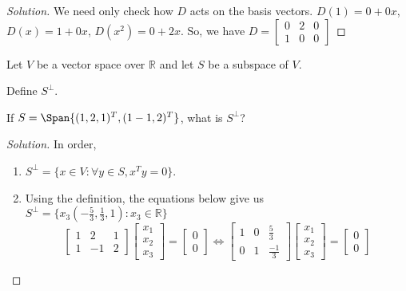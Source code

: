 \documentclass[crop=false,class=book,oneside]{standalone}
\begin{document}
\begin{proof}[Solution]
We need only check how $D$ acts on the basis vectors. $D(1) = 0+0x$, $D(x) = 1+0x$, $D(x^2) = 0+2x$. So, we have $D = \begin{bmatrix} 0 & 2 & 0 \\ 1 & 0 & 0 \end{bmatrix}$
\end{proof}
\begin{problem}
Let $V$ be a vector space over $\mathbb{R}$ and let $S$ be a subspace of $V$.
\begin{enumerate}
\begin{multicols}{2}
    \item Define $S^{\perp}$.
    \item If $S=\Span\{ (1,2,1)^T, (1-1,2)^T\}$, what is $S^{\perp}$?
\end{multicols}
\end{enumerate}
\end{problem}
\begin{proof}[Solution]
In order,
\begin{enumerate}
    \item $S^{\perp} = \{x\in V: \forall y\in S, x^T y = 0\}$.
    \item Using the definition, the equations below give us $S^{\perp}=\{x_{3}(-\frac{5}{3},\frac{1}{3},1):x_{3}\in \mathbb{R}\}$
    \begin{equation*}
        \begin{bmatrix}1&2&1\\1&-1&2\end{bmatrix}\begin{bmatrix}x_1\\x_2\\x_3\end{bmatrix}=\begin{bmatrix}0\\0\end{bmatrix}\Leftrightarrow\begin{bmatrix}1&0&\frac{5}{3} \\0&1&\frac{-1}{3}\end{bmatrix}\begin{bmatrix}x_1\\x_2\\x_3\end{bmatrix}=\begin{bmatrix}0\\0\end{bmatrix}
    \end{equation*}
\end{enumerate}
\end{proof}
\end{document}
